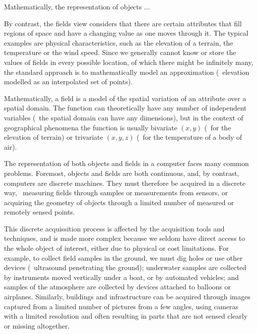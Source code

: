 Mathematically, the representation of objects ...

By contrast, the fields view considers that there are certain attributes that fill regions of space and have a changing value as one moves through it.
The typical examples are physical characteristics, such as the elevation of a terrain, the temperature or the wind speed.
Since we generally cannot know or store the values of fields in every possible location, of which there might be infinitely many, the standard approach is to mathematically model an approximation (\eg\ elevation modelled as an interpolated set of points).

Mathematically, a field is a model of the spatial variation of an attribute over a spatial domain.
The function can theoretically have any number of independent variables (\ie\ the spatial domain can have any dimensions), but in the context of geographical phenomena the function is usually bivariate \((x,y)\) (\eg\ for the elevation of terrain) or trivariate \((x,y,z)\) (\eg\ for the temperature of a body of air).

%

The representation of both objects and fields in a computer faces many common problems. 
Foremost, objects and fields are both continuous, and, by contrast, computers are discrete machines. 
They must therefore be acquired in a discrete way, \eg\ measuring fields through samples or measurements from sensors, or acquiring the geometry of objects through a limited number of measured or remotely sensed points.

This discrete acquissition process is affected by the acquisition tools and techniques, and is made more complex because we seldom have direct access to the whole object of interest, either due to physical or cost limitations.
For example, to collect field samples in the ground, we must dig holes or use other devices (\eg\ ultrasound penetrating the ground); underwater samples are collected by instruments moved vertically under a boat, or by automated vehicles; and samples of the atmosphere are collected by devices attached to balloons or airplanes.
Similarly, buildings and infrastructure can be acquired through images captured from a limited number of pictures from a few angles, using cameras with a limited resolution and often resulting in parts that are not sensed clearly or missing altogether.

